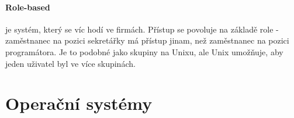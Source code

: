 \paragraph{Role-based} je systém, který se víc hodí ve firmách. Přístup se povoluje na základě role - zaměstnanec na pozici sekretářky má přístup jinam, než zaměstnanec na pozici programátora. Je to podobné jako skupiny na Unixu, ale Unix umožňuje, aby jeden uživatel byl ve více skupinách.






\section{Operační systémy}





















